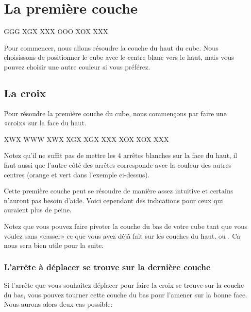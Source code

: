 \chapter{La première couche}

{
\centering
{}
\RubikFaceRight%
{G}{G}{G}%
{X}{G}{X}%
{X}{X}{X}
\RubikFaceFront%
{O}{O}{O}%
{X}{O}{X}%
{X}{X}{X}
\par
}
\medskip

Pour commencer, nous allons résoudre la couche du haut du cube. Nous choisissons de positionner
le cube avec le centre blanc vers le haut, mais vous pouvez choisir une autre couleur si vous préférez.


\section{La croix}

Pour résoudre la première couche du cube, nous commençons
par faire une «croix» sur la face du haut.

\begin{center}
\RubikFaceUp%
{X}{W}{X}%
{W}{W}{W}%
{X}{W}{X}
\RubikFaceRight%
{X}{G}{X}%
{X}{G}{X}%
{X}{X}{X}
\RubikFaceFront%
{X}{O}{X}%
{X}{O}{X}%
{X}{X}{X}
\end{center}

Notez qu'il ne suffit pas de mettre les 4 arrêtes blanches sur la face du haut, il faut aussi
que l'autre côté des arrêtes corresponde avec la couleur des autres centres (orange et vert dans l'exemple ci-dessus).

Cette première couche peut se résoudre de manière assez intuitive et certains n'auront pas besoin
d'aide. Voici cependant des indications pour ceux qui auraient plus de peine.

Notez que vous pouvez faire pivoter la couche du bas de votre cube tant que vous voulez sans «casser» ce que vous avez déjà fait sur les couches du haut.  ou . Ca nous sera bien utile pour la suite.

\subsection{L'arrête à déplacer se trouve sur la dernière couche}
\label{subsec:c1d}

Si l'arrête que vous souhaitez déplacer pour faire la croix se trouve sur la couche du bas, vous pouvez tourner cette couche du bas pour l'amener sur la bonne face. Nous aurons alors deux cas possible:

